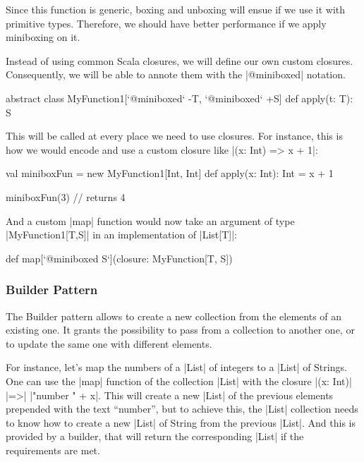 Since this function is generic, boxing and unboxing will ensue if we use it with primitive types. Therefore, we should have better performance if we apply miniboxing on it.

Instead of using common Scala closures, we will define our own custom closures. Consequently, we will be able to annote them with the |@miniboxed| notation.

\begin{lstlisting-nobreak}
 abstract class MyFunction1[`@miniboxed` -T, `@miniboxed` +S] {
   def apply(t: T): S
 }
\end{lstlisting-nobreak}

This will be called at every place we need to use closures. For instance, this is how we would encode and use a custom closure like |(x: Int) => x + 1|:

\begin{lstlisting-nobreak}
 val miniboxFun = new MyFunction1[Int, Int] {
   def apply(x: Int): Int = x + 1
 }

 miniboxFun(3)   // returns 4
\end{lstlisting-nobreak}

And a custom |map| function would now take an argument of type |MyFunction1[T,S]| in an implementation of |List[T]|:

\begin{lstlisting-nobreak}
 def map[`@miniboxed S`](closure: MyFunction[T, S])
\end{lstlisting-nobreak}

\subsubsection{Builder Pattern}

The Builder pattern allows to create a new collection from the elements of an existing one. It grants the possibility to pass from a collection to another one, or to update the same one with different elements.


For instance, let's map the numbers of a |List| of integers to a |List| of Strings. One can use the |map| function of the collection |List| with the closure |(x: Int)| |=>| |"number " + x|. This will create a new |List| of the previous elements prepended with the text ``number'', but to achieve this, the |List| collection needs to know how to create a new |List| of String from the previous |List|. And this is provided by a builder, that will return the corresponding |List| if the requirements are met.

